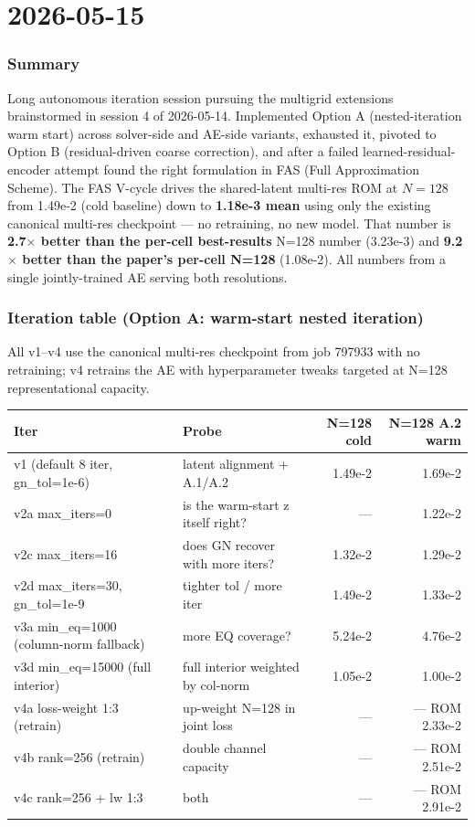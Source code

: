 \section{2026-05-15}


\subsubsection*{Summary}
Long autonomous iteration session pursuing the multigrid extensions
brainstormed in session 4 of 2026-05-14. Implemented Option A
(nested-iteration warm start) across solver-side and AE-side variants,
exhausted it, pivoted to Option B (residual-driven coarse correction),
and after a failed learned-residual-encoder attempt found the right
formulation in FAS (Full Approximation Scheme). The FAS V-cycle drives
the shared-latent multi-res ROM at $N{=}128$ from 1.49e-2 (cold baseline)
down to \textbf{1.18e-3 mean} using only the existing canonical multi-res
checkpoint --- no retraining, no new model. That number is
\textbf{2.7$\times$ better than the per-cell best-results} N=128 number
(3.23e-3) and \textbf{9.2$\times$ better than the paper's per-cell N=128}
(1.08e-2). All numbers from a single jointly-trained AE serving both
resolutions.

\subsubsection*{Iteration table (Option A: warm-start nested iteration)}

All v1--v4 use the canonical multi-res checkpoint from job 797933 with
no retraining; v4 retrains the AE with hyperparameter tweaks targeted at
N=128 representational capacity.

\begin{center}
\begin{tabular}{l l r r}
  \textbf{Iter} & \textbf{Probe} & \textbf{N=128 cold} & \textbf{N=128 A.2 warm} \\
  \hline
  v1 (default 8 iter, gn\_tol=1e-6) & latent alignment + A.1/A.2 & 1.49e-2 & 1.69e-2 \\
  v2a max\_iters=0 & is the warm-start z itself right? & --- & 1.22e-2 \\
  v2c max\_iters=16 & does GN recover with more iters? & 1.32e-2 & 1.29e-2 \\
  v2d max\_iters=30, gn\_tol=1e-9 & tighter tol / more iter & 1.49e-2 & 1.33e-2 \\
  v3a min\_eq=1000 (column-norm fallback) & more EQ coverage? & 5.24e-2 & 4.76e-2 \\
  v3d min\_eq=15000 (full interior) & full interior weighted by col-norm & 1.05e-2 & 1.00e-2 \\
  v4a loss-weight 1:3 (retrain) & up-weight N=128 in joint loss & --- & --- ROM 2.33e-2 \\
  v4b rank=256 (retrain) & double channel capacity & --- & --- ROM 2.51e-2 \\
  v4c rank=256 + lw 1:3 & both & --- & --- ROM 2.91e-2 \\
\end{tabular}
\end{center}


